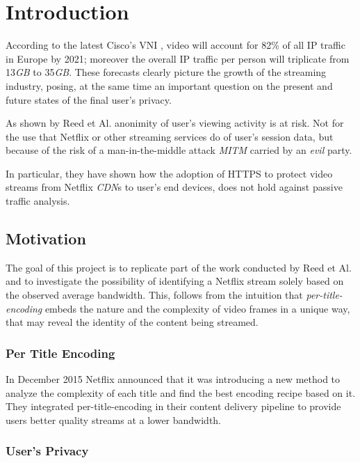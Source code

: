 \chapter{Introduction}\label{sec:introduction}

According to the latest Cisco's VNI \cite{video-traffic-forecast}, video will
account for 82\% of all IP traffic in Europe by 2021; moreover the overall IP
traffic per person will triplicate from 13\emph{GB} to 35\emph{GB}. These
forecasts clearly picture the growth of the streaming industry, posing, at the
same time an important question on the present and future states of the final
user's privacy.

As shown by Reed et Al. \cite{netflix-real-time} anonimity of user's viewing
activity is at risk. Not for the use that Netflix or other streaming services
do of user's session data, but because of the risk of a man-in-the-middle
attack \emph{MITM} carried by an \textit{evil} party. 

In particular, they have shown how the adoption of HTTPS to protect video
streams from Netflix \emph{CDN}s to user's end devices, does not hold against
passive traffic analysis.

\section{Motivation}\label{sec:motivation}

The goal of this project is to replicate part of the work conducted by Reed et
Al. and to investigate the possibility of identifying a Netflix stream solely
based on the observed average bandwidth. This, follows from the intuition that
\emph{per-title-encoding} embeds the nature and the complexity of video frames
in a unique way, that may reveal the identity of the content being streamed.

\subsection{Per Title Encoding}\label{per-title-encoding}

In December 2015 Netflix announced \cite{per-title-encoding} that it was
introducing a new method to analyze the complexity of each title and find the
best encoding recipe based on it. They integrated per-title-encoding in their
content delivery pipeline to provide users better quality streams at a lower
bandwidth. 


\subsection{User's Privacy}\label{privacy}

